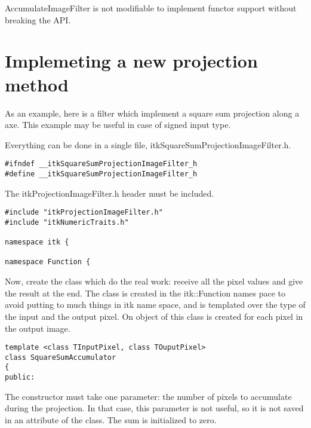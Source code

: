 \documentclass{InsightArticle}
\begin{document}
AccumulateImageFilter is not modifiable to implement functor support without
breaking the API.

\section{Implemeting a new projection method}
As an example, here is a filter which implement a square sum projection along a
axe. This example may be useful in case of signed input type.

Everything can be done in a single file, itkSquareSumProjectionImageFilter.h.
\small \begin{verbatim}
#ifndef __itkSquareSumProjectionImageFilter_h
#define __itkSquareSumProjectionImageFilter_h
\end{verbatim} \normalsize
The itkProjectionImageFilter.h header must be included.
\small \begin{verbatim}
#include "itkProjectionImageFilter.h"
#include "itkNumericTraits.h"

namespace itk {

namespace Function {
\end{verbatim} \normalsize
Now, create the class which do the real work: receive all the pixel values and
give the result at the end. The class is created in the itk::Function names pace
to avoid putting to much things in itk name space, and is templated over the
type of the input and the output pixel.
On object of this class is created for each pixel in the output image.
\small \begin{verbatim}
template <class TInputPixel, class TOuputPixel>
class SquareSumAccumulator
{
public:
\end{verbatim} \normalsize
The constructor must take one parameter: the number of pixels to accumulate
during the projection. In that case, this parameter is not useful, so it is not
saved in an attribute of the class. The sum is initialized to zero.
\end{document}
